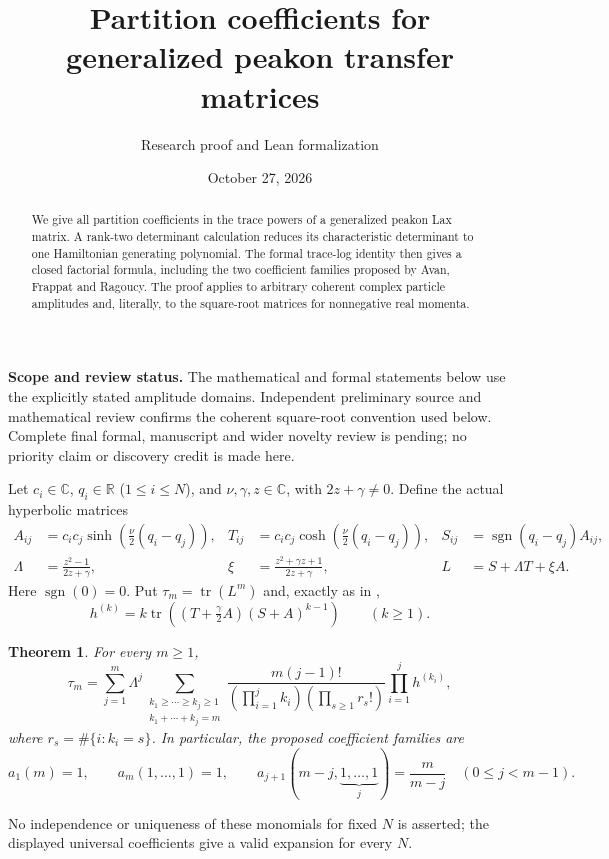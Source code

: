 \documentclass[11pt]{article}
\title{Partition coefficients for generalized peakon transfer matrices}
\author{Research proof and Lean formalization}
\date{October 27, 2026}
\newtheorem{theorem}{Theorem}
\begin{document}
\maketitle
\begin{abstract}
We give all partition coefficients in the trace powers of a generalized peakon Lax matrix. A rank-two determinant calculation reduces its characteristic determinant to one Hamiltonian generating polynomial. The formal trace-log identity then gives a closed factorial formula, including the two coefficient families proposed by Avan, Frappat and Ragoucy. The proof applies to arbitrary coherent complex particle amplitudes and, literally, to the square-root matrices for nonnegative real momenta.
\end{abstract}
\noindent\textbf{Scope and review status.} The mathematical and formal statements below use the explicitly stated amplitude domains. Independent preliminary source and mathematical review confirms the coherent square-root convention used below. Complete final formal, manuscript and wider novelty review is pending; no priority claim or discovery credit is made here.

Let $c_i\in\mathbb C$, $q_i\in\mathbb R$ ($1\leq i\leq N$), and $\nu,\gamma,z\in\mathbb C$, with $2z+\gamma\ne0$. Define the actual hyperbolic matrices
\begin{align*}
 A_{ij}&=c_ic_j\sinh\!\left(\frac\nu2(q_i-q_j)\right),&
 T_{ij}&=c_ic_j\cosh\!\left(\frac\nu2(q_i-q_j)\right),&
 S_{ij}&=\operatorname{sgn}(q_i-q_j)A_{ij},\\
 \Lambda&=\frac{z^2-1}{2z+\gamma},&
 \xi&=\frac{z^2+\gamma z+1}{2z+\gamma},&
 L&=S+\Lambda T+\xi A.
\end{align*}
Here $\operatorname{sgn}(0)=0$. Put $\tau_m=\operatorname{tr}(L^m)$ and, exactly as in \cite[eq.~(5.17)]{AFR},
\begin{equation}\label{h}
 h^{(k)}=k\operatorname{tr}\left((T+\tfrac\gamma2 A)(S+A)^{k-1}\right)\qquad(k\geq1).
\end{equation}

\begin{theorem}\label{main}
For every $m\geq1$,
\begin{equation}\label{expansion}
 \tau_m=\sum_{j=1}^m\Lambda^j
 \sum_{\substack{k_1\geq\cdots\geq k_j\geq1\\k_1+\cdots+k_j=m}}
 \frac{m(j-1)!}{(\prod_{i=1}^j k_i)(\prod_{s\geq1}r_s!)}
 \prod_{i=1}^j h^{(k_i)},
\end{equation}
where $r_s=\#\{i:k_i=s\}$. In particular, the proposed coefficient families are
\begin{equation}\label{special}
 a_1(m)=1,\qquad a_m(1,\ldots,1)=1,\qquad
 a_{j+1}(m-j,\underbrace{1,\ldots,1}_{j})=\frac m{m-j}\quad(0\leq j<m-1).
\end{equation}
\end{theorem}
No independence or uniqueness of these monomials for fixed $N$ is asserted; the displayed universal coefficients give a valid expansion for every $N$.
\end{document}
